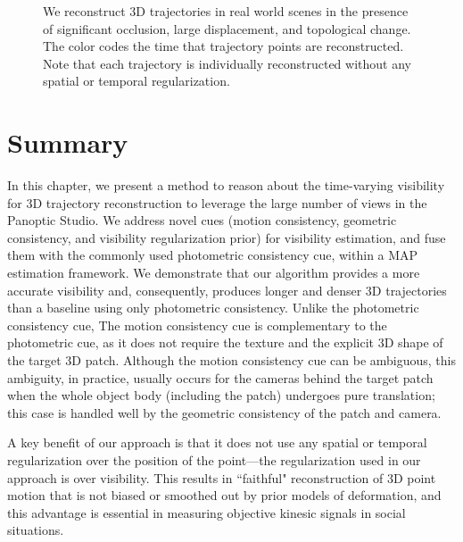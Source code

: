 \begin{figure}[t]
	\caption{We reconstruct 3D trajectories in real world scenes in the presence of significant occlusion, large displacement, and topological change. The color codes the time that trajectory points are reconstructed. Note that each trajectory is individually reconstructed without any spatial or temporal regularization.} 
	\label{Fig:qualtitative}
\end{figure}


\section{Summary}
In this chapter, we present a method to reason about the time-varying visibility for 3D trajectory reconstruction to leverage the large number of views in the Panoptic Studio. We address novel cues (motion consistency, geometric consistency, and visibility regularization prior) for visibility estimation, and fuse them with the commonly used photometric consistency cue, within a MAP estimation framework. We demonstrate that our algorithm provides a more accurate visibility and, consequently, produces longer and denser 3D trajectories than a baseline using only photometric consistency. Unlike the photometric consistency cue, The motion consistency cue is complementary to the photometric cue, as it does not require the texture and the explicit 3D shape of the target 3D patch. Although the motion consistency cue can be ambiguous, this ambiguity, in practice, usually occurs for the cameras behind the target patch when the whole object body (including the patch) undergoes pure translation; this case is handled well by the geometric consistency of the patch and camera. 

A key benefit of our approach is that it does not use any spatial or temporal regularization over the position of the point---the regularization used in our approach is over visibility. This results in ``faithful" reconstruction of 3D point motion that is not biased or smoothed out by prior models of deformation, and this advantage is essential in measuring objective kinesic signals in social situations. 


\pagebreak